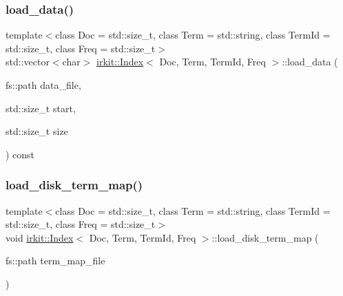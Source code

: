 \subsubsection{\texorpdfstring{load\+\_\+data()}{load\_data()}\hspace{0.1cm}{\footnotesize\ttfamily [2/2]}}
{\footnotesize\ttfamily template$<$class Doc  = std\+::size\+\_\+t, class Term  = std\+::string, class Term\+Id  = std\+::size\+\_\+t, class Freq  = std\+::size\+\_\+t$>$ \\
std\+::vector$<$char$>$ \mbox{\hyperlink{classirkit_1_1Index}{irkit\+::\+Index}}$<$ Doc, Term, Term\+Id, Freq $>$\+::load\+\_\+data (\begin{DoxyParamCaption}\item[{fs\+::path}]{data\+\_\+file,  }\item[{std\+::size\+\_\+t}]{start,  }\item[{std\+::size\+\_\+t}]{size }\end{DoxyParamCaption}) const\hspace{0.3cm}{\ttfamily [inline]}}

\mbox{\label{classirkit_1_1Index_af4a590ea760157bbb7bb12a6f8df8fe5}} 
\subsubsection{\texorpdfstring{load\+\_\+disk\+\_\+term\+\_\+map()}{load\_disk\_term\_map()}}
{\footnotesize\ttfamily template$<$class Doc  = std\+::size\+\_\+t, class Term  = std\+::string, class Term\+Id  = std\+::size\+\_\+t, class Freq  = std\+::size\+\_\+t$>$ \\
void \mbox{\hyperlink{classirkit_1_1Index}{irkit\+::\+Index}}$<$ Doc, Term, Term\+Id, Freq $>$\+::load\+\_\+disk\+\_\+term\+\_\+map (\begin{DoxyParamCaption}\item[{fs\+::path}]{term\+\_\+map\+\_\+file }\end{DoxyParamCaption})\hspace{0.3cm}{\ttfamily [inline]}}

\mbox{\label{classirkit_1_1Index_af518f3df5f1821166be4ea706c30c533}} 
